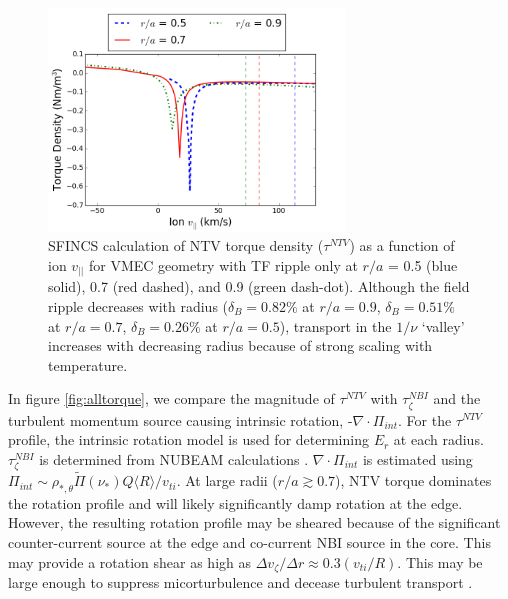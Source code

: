 \documentclass{article}
\begin{document}
\begin{figure}[h!]
\centering
\includegraphics[width=0.7\textwidth]
{Torque_radiusscaling.png}
\caption{\label{fig:Torque_radiusscaling} SFINCS calculation of NTV torque density ($\tau^{NTV}$) as a function of ion $v_{||}$ for VMEC geometry with TF ripple only at $r/a$ = 0.5 (blue solid), 0.7 (red dashed), and 0.9 (green dash-dot). Although the field ripple decreases with radius ($\delta_B = 0.82\%$ at $r/a = 0.9$, $\delta_B = 0.51\%$ at $r/a = 0.7$, $\delta_B = 0.26\%$ at $r/a = 0.5$), transport in the $1/\nu$ `valley' increases with decreasing radius because of strong scaling with temperature. }
\end{figure}

In figure \ref{fig:alltorque}, we compare the magnitude of $\tau^{NTV}$ with $\tau_{\zeta}^{NBI}$ and the turbulent momentum source causing intrinsic rotation, -$\nabla \cdot \Pi_{int}$. For the $\tau^{NTV}$ profile, the intrinsic rotation model is used for determining $E_r$ at each radius. $\tau_{\zeta}^{NBI}$ is determined from NUBEAM calculations \cite{Poli2014}. $\nabla \cdot \Pi_{int}$ is estimated using $\Pi_{int} \sim \rho_{*, \theta} \widetilde{\Pi}(\nu_*) Q \langle R \rangle/v_{ti}$. %
At large radii ($r/a \gtrsim 0.7$), NTV torque dominates the rotation profile and will likely significantly damp rotation at the edge. However, the resulting rotation profile may be sheared because of the significant counter-current source at the edge and co-current NBI source in the core. This may provide a rotation shear as high as $\Delta v_{\zeta}/ \Delta r \approx 0.3 (v_{ti}/R)$. This may be large enough to suppress micorturbulence and decease turbulent transport \cite{Hahm1994}. 
\end{document}
